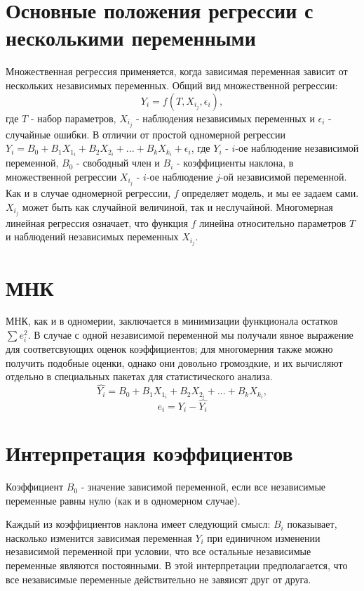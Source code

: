 \section{Основные положения регрессии с несколькими переменными}
\hspace*{\parindent}
Множественная регрессия применяется, когда зависимая переменная зависит от нескольких независимых переменных. Общий вид множественной регрессии: $$ Y_i = f(T, X_i_j, \epsilon_i),$$
где $T$ - набор параметров, $X_i_j$ - наблюдения независимых переменных и $\epsilon_i$ - случайные ошибки.
\hspace*{\parindent}
В отличии от простой одномерной регрессии $Y_i = B_0 + B_1X_1_i +B_2X_2_i  + ... + B_kX_k_i + \epsilon_i$, где $Y_i$ - $i$-ое наблюдение независимой переменной, $B_0$ - свободный член и $B_i$ - коэффициенты наклона, в множественной регрессии $X_i_j$ - $i$-ое наблюдение $j$-ой независимой переменной.
Как и в случае одномерной регрессии, $f$ определяет модель, и мы ее задаем сами. $X_i_j$ может быть как случайной величиной, так и неслучайной. 
Многомерная линейная регрессия означает, что функция $f$ линейна относительно параметров $T$ и наблюдений независимых переменных $X_i_j$.
\section{МНК}
\hspace*{\parindent}
МНК, как и в одномерии, заключается в минимизации функционала остатков$\sum e^2_i$. В случае с одной независимой переменной мы получали явное выражение для соответсвующих оценок коэффициентов; для многомерния также можно получить подобные оценки, однако они довольно громоздкие, и их вычисляют отдельно в специальных пакетах для статистического анализа.
$$\hat{Y_i} = B_0 + B_1X_1_i +B_2X_2_i  + ... + B_kX_k_i,$$
$$e_i = Y_i - \hat{Y_i}$$



\section{Интерпретация коэффициентов}
\hspace*{\parindent}
Коэффициент $B_0$ - значение зависимой переменной, если все независимые переменные равны нулю (как и в одномерном случае). 

Каждый из коэффициентов наклона имеет следующий смысл: $B_i$ показывает, насколько изменится зависимая переменная $Y_i$ при единичном изменении независимой переменной при условии, что все остальные независимые переменные являются постоянными. В этой интерпретации предполагается, что все независимые переменные действительно не завяисят друг от друга.

